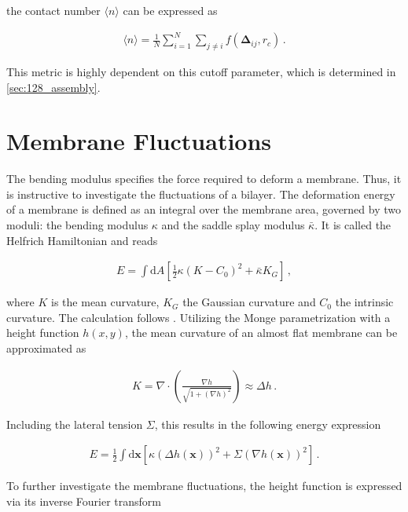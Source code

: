 \documentclass[
    11pt,
    a4paper,
    oneside,        %
    BCOR=10mm,      %
    parskip=half,   %
    listof=nototoc,   %
    bibliography=totoc %
]{scrreprt}
\begin{document}
the contact number $\langle n \rangle$ can be expressed as 

\begin{align}
    \langle n \rangle = \frac{1}{N} \sum_{i = 1}^N \sum_{j \neq i} f(\mathbf{\Delta}_{ij}, r_c)\, .
\end{align}


This metric is highly dependent on this cutoff parameter, which is determined in \cref{sec:128_assembly}.

\section{Membrane Fluctuations} \label{sec:ben_mod_fourier}

The bending modulus specifies the force required to deform a membrane. Thus, it is instructive to investigate the fluctuations of a bilayer. The deformation energy of a membrane is defined as an integral over the membrane area, governed by two moduli: the bending modulus $\kappa$ and the saddle splay modulus $\bar{\kappa}$. It is called the Helfrich Hamiltonian \cite{Helfrich_paper} and reads

\begin{align}
    E = \int \mathrm d A \left[ \frac{1}{2}\kappa 
    (K - C_0)^2 + \bar{\kappa}K_G \right]\, , \label{eq:helfrich_energy}
\end{align}

where $K$ is the mean curvature, $K_G$ the Gaussian curvature and $C_0$ the intrinsic curvature. The calculation follows \citeauthor{Markus_tethers} \cite{Markus_tethers,Schwarz2024}. Utilizing the Monge parametrization with a height function $h(x,y)$, the mean curvature of an almost flat membrane can be approximated as

\begin{align}
    K = \nabla \cdot \left( \frac{\nabla h}{\sqrt{1 + (\nabla h)^2}}\right)
    \approx \Delta h \, .
\end{align}

Including the lateral tension $\Sigma$, this results in the following energy expression

\begin{align}
    E = \frac{1}{2} \int \mathrm d\mathbf x \left[ 
        \kappa (\Delta h(\mathbf x))^2 + \Sigma (\nabla h(\mathbf x))^2 \right]\, . \label{eq:mem_energy}
\end{align}

To further investigate the membrane fluctuations, the height function is expressed via its inverse Fourier transform 
\end{document}
